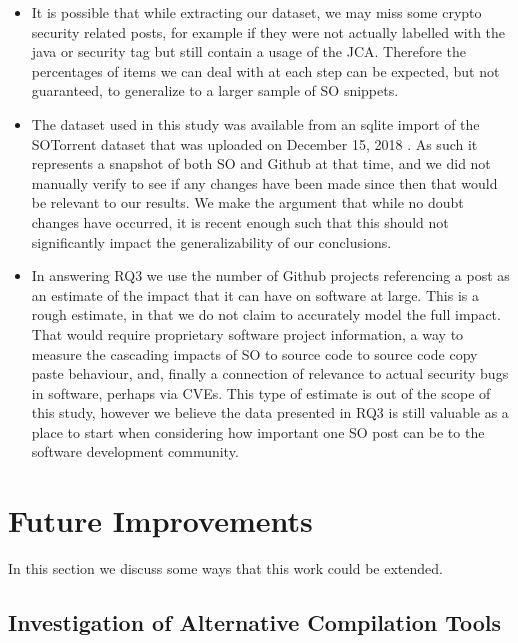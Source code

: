 \documentclass[10pt, conference]{IEEEtran}
\begin{document}
\begin{itemize}
\item
It is possible that while extracting our dataset, we may miss some crypto security related posts, for example if they were not actually labelled with the java or security tag but still contain a usage of the JCA. Therefore the percentages of items we can deal with at each step can be expected, but not guaranteed, to generalize to a larger sample of SO snippets.

\item
The dataset used in this study was available from an sqlite import of the SOTorrent dataset that was uploaded on December 15, 2018 \cite{wong_2019}. As such it represents a snapshot of both SO and Github at that time, and we did not manually verify to see if any changes have been made since then that would be relevant to our results. We make the argument that while no doubt changes have occurred, it is recent enough such that this should not significantly impact the generalizability of our conclusions.

\item 
In answering RQ3 we use the number of Github projects referencing a post as an estimate of the impact that it can have on software at large. This is a rough estimate, in that we do not claim to accurately model the full impact. That would require proprietary software project information, a way to measure the cascading impacts of SO to source code to source code copy paste behaviour, and, finally a connection of relevance to actual security bugs in software, perhaps via CVEs. This type of estimate is out of the scope of this study, however we believe the data presented in RQ3 is still valuable as a place to start when considering how important one SO post can be to the software development community.

\end{itemize} 


\section{Future Improvements}
 
In this section we discuss some ways that this work could be extended.

\subsection{Investigation of Alternative Compilation Tools}
\end{document}

